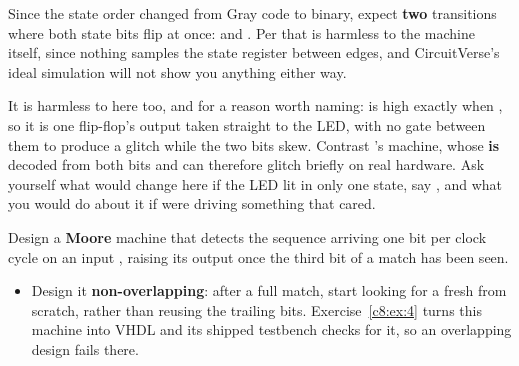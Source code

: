 \note[Tip] Since the state order changed from Gray code to binary, expect \textbf{two} transitions
where both state bits flip at once:  and . Per  that is
harmless to the machine itself, since nothing samples the state register between edges, and
CircuitVerse's ideal simulation will not show you anything either way.

It is harmless to  here too, and for a reason worth naming:  is high exactly when
, so it is one flip-flop's output taken straight to the LED, with no gate between them
to produce a glitch while the two bits skew. Contrast 's machine, whose
 \textbf{is} decoded from both bits and can therefore glitch briefly on real
hardware. Ask yourself what would change here if the LED lit in only one state, say , and
what you would do about it if  were driving something that cared.

\label{c8:set:2}

\label{c8:ex:2}
Design a \textbf{Moore} machine that detects the sequence  arriving one bit per clock
cycle on an input , raising its output  once the third bit of a match has been
seen.
\begin{itemize}
  \item Design it \textbf{non-overlapping}: after a full match, start looking for a fresh
     from scratch, rather than reusing the trailing bits. Exercise~\ref{c8:ex:4} turns
    this machine into VHDL and its shipped testbench checks for it, so an overlapping design fails
    there.
\end{itemize}

